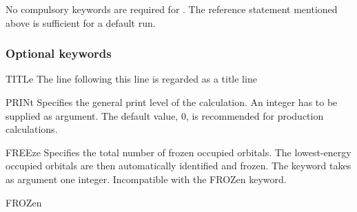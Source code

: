 No compulsory keywords are required for .
The reference statement mentioned
above is sufficient for a default  run.

\subsubsection{Optional keywords}

\begin{keywordlist}
\item[TITLe]
The line following this line is regarded as a title line
\item[PRINt]
Specifies the general print level of the calculation. An integer
has to be supplied as argument.
The default value, 0, is recommended for production calculations.
\item[FREEze]
Specifies the total number of frozen occupied orbitals.
The lowest-energy occupied orbitals are then automatically identified and frozen.
The keyword takes as argument one integer.
Incompatible with the {\keyfont FROZen} keyword.
\item[FROZen]

\end{keywordlist}
